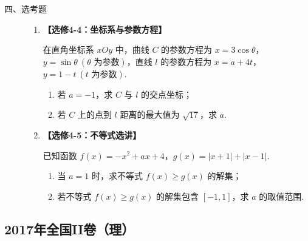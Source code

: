 \begin{description}

    \item[四、选考题]

    \begin{enumerate}[leftmargin=5pt]

      \addtocounter{enumi}{+21}

        \item \textbf{【选修4-4：坐标系与参数方程】}

在直角坐标系 \(xOy\) 中，曲线 \(C\) 的参数方程为 \(x=3\cos\theta\)，\(y=\sin\theta\ (\theta\text{ 为参数})\)，直线 \(l\) 的参数方程为 \(x=a+4t\)，\(y=1-t\ (t\text{ 为参数})\).

\begin{enumerate}
\item 若 \(a=-1\)，求 \(C\) 与 \(l\) 的交点坐标；
\item 若 \(C\) 上的点到 \(l\) 距离的最大值为 \(\sqrt{17}\)，求 \(a\).
\end{enumerate}

        \item \textbf{【选修4-5：不等式选讲】}

已知函数 \(f(x)=-x^2+ax+4\)，\(g(x)=|x+1|+|x-1|\).

\begin{enumerate}
\item 当 \(a=1\) 时，求不等式 \(f(x)\ge g(x)\) 的解集；
\item 若不等式 \(f(x)\ge g(x)\) 的解集包含 \([-1,1]\)，求 \(a\) 的取值范围.
\end{enumerate}

    \end{enumerate}

\end{description}


\subsection{2017年全国II卷（理）}\label{gk:2017年全国II卷（理）}


